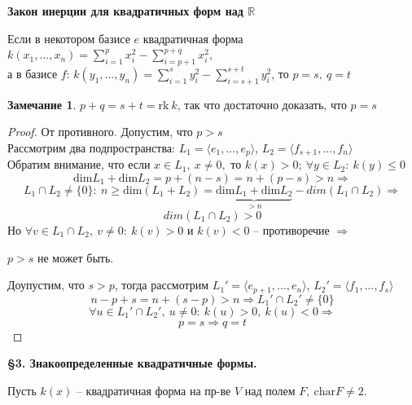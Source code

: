 \documentclass[a4paper, 12pt]{article}
\theoremstyle{definition}
\newtheorem*{remark}{Замечание}
\begin{document}
    \begin{center}
        \textbf{Закон инерции для квадратичных форм над $\mathbb{R}$} 
    \end{center}
    Если в некотором базисе $e$ квадратичная форма $k(x_1,...,
    x_n) = \sum\limits_{i=1}^{p}x_i^2 - \sum\limits_{i=p+1}^{p+q}
    x_i^2$,\\ а в базисе $f$: $k(y_1,...,y_n) = \sum\limits_
    {i=1}^{s}y_i^2 - \sum\limits_{i=s+1}^{s+t}y_i^2$,
    то $p = s,\ q = t$
    \begin{remark}
        $p+q = s+t = \text{rk}\ k$, так что достаточно доказать,
        что $p = s$  
    \end{remark}   
    \begin{proof}
        От противного. Допустим, что $p>s$\\
        Рассмотрим два подпространства:
        $L_1 = \langle e_1,...,e_p\rangle$, $L_2 = \langle f_{s
        +1},...,f_n\rangle$\\
        Обратим внимание, что если $x \in L_1,\ x \neq 0,$
        то $k(x) > 0;\ \forall y \in L_2:\ k(y) \leq 0$
        $$\text{dim}L_1 + \text{dim}L_2 = p + (n-s) = n +
        (p-s) > n\Longrightarrow$$ $$L_1 \cap L_2 \neq \{0\}:\ 
        n \geq \text{dim}(L_1 + L_2) = \underbrace{\text{dim}
        L_1 + \text{dim}L_2}_{> n} - dim(L_1 \cap L_2)
        \Longrightarrow$$
        $$dim(L_1 \cap L_2) > 0$$
        \newpage
        Но $\forall v \in L_1 \cap L_2,\ v \neq 0:\ 
        k(v) > 0$ и $k(v) < 0$ -- противоречие $\Longrightarrow$
        \begin{flushright}
            $p > s$ не может быть.
        \end{flushright}
        Доупустим, что $s > p$, тогда рассмотрим
        $L_1' = \langle e_{p+1},...,e_n\rangle$, 
        $L_2' = \langle f_{1},...,f_s\rangle$
        $$n - p + s = n + (s - p) > n \Longrightarrow
        L_1' \cap L_2' \neq \{0\}$$
        $$\forall u \in L_1' \cap L_2',\ u \neq 0:\ k(u) > 0,\ k(u) < 0 
        \Longrightarrow$$ $$p = s \Longrightarrow q = t$$

    \end{proof}
    \begin{center}
        \begin{Large}
            \textbf{\S 3. Знакоопределенные квадратичные формы.} 
        \end{Large}
    \end{center}
    Пусть $k(x)$ -- квадратичная форма на пр-ве $V$
    над полем $F,\ \text{char}F \neq 2$.\\
\end{document}
